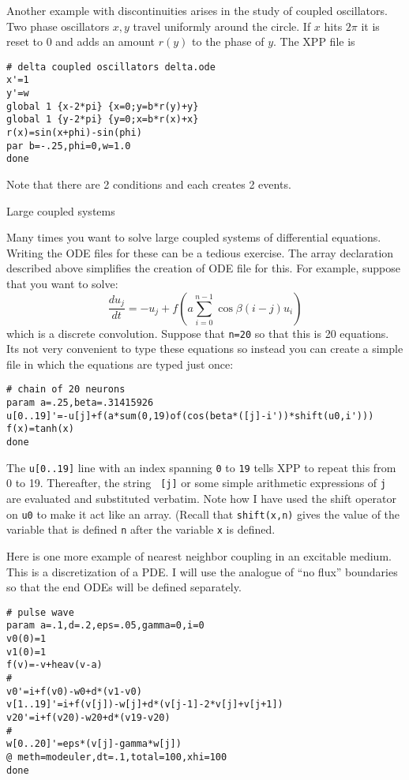 \documentclass{article}
\newcommand{\tc}[1]{\addcontentsline{toc}{subsection}{#1}}
\begin{document}
Another example with discontinuities arises in the study of coupled
oscillators.  Two phase oscillators $x,y$ travel uniformly around the
circle.  If $x$ hits $2\pi$ it is  reset to 0 and adds an amount
$r(y)$ to the phase of $y.$  The XPP file is
\begin{verbatim}
# delta coupled oscillators delta.ode
x'=1
y'=w
global 1 {x-2*pi} {x=0;y=b*r(y)+y}
global 1 {y-2*pi} {y=0;x=b*r(x)+x}
r(x)=sin(x+phi)-sin(phi)
par b=-.25,phi=0,w=1.0
done
\end{verbatim}
Note that there are 2 conditions and each creates 2 events.
\medskip

\tc{Large coupled systems}\begin{center}
Large coupled systems
\end{center}
Many times you want to solve large coupled systems of differential
equations.  Writing the ODE files for these can be a tedious exercise.
The array declaration described above simplifies the creation of ODE
file for this.
For
example, suppose that you want to solve:
\[
\frac{du_j}{dt} = -u_j + f(a\sum_{i=0}^{n-1}\cos\beta(i-j) u_i)
\]
which is a discrete convolution.  Suppose that {\tt n=20} so that this
is 20 equations.  Its not very convenient to type these equations so
instead you can create a simple file in which the equations are typed
just once:
\begin{verbatim}
# chain of 20 neurons
param a=.25,beta=.31415926
u[0..19]'=-u[j]+f(a*sum(0,19)of(cos(beta*([j]-i'))*shift(u0,i')))
f(x)=tanh(x)
done
\end{verbatim}
The {\tt u[0..19]} line with an index spanning {\tt 0} to {\tt 19}
tells XPP to repeat this from 0 to 19.  Thereafter, the string {\tt
[j]} or some simple arithmetic expressions of {\tt j} are evaluated
and substituted verbatim.  
Note how I have used the shift operator on {\tt u0} to make it act like
an array. (Recall that {\tt shift(x,n)} gives the value of the
variable that is defined {\tt n} after the variable {\tt x} is
defined.  

Here is one more example of nearest neighbor coupling in an excitable
medium.  This is a discretization of a PDE.  I will use the analogue
of ``no flux'' boundaries so that the end ODEs will be defined separately.  
\begin{verbatim}
# pulse wave
param a=.1,d=.2,eps=.05,gamma=0,i=0
v0(0)=1
v1(0)=1
f(v)=-v+heav(v-a)
#
v0'=i+f(v0)-w0+d*(v1-v0)
v[1..19]'=i+f(v[j])-w[j]+d*(v[j-1]-2*v[j]+v[j+1])
v20'=i+f(v20)-w20+d*(v19-v20)
#
w[0..20]'=eps*(v[j]-gamma*w[j])
@ meth=modeuler,dt=.1,total=100,xhi=100
done
\end{verbatim}
\end{document}
